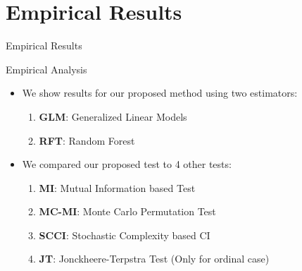 \documentclass{beamer}
\def\ci{\perp\!\!\!\!\!\perp}
\begin{document}
\section{Empirical Results}
\begin{frame}
	\begin{center} \Huge{Empirical Results} \end{center}
\end{frame}
\begin{frame}{Empirical Analysis}
	\begin{itemize}
		\setlength\itemsep{1em}
		\item We show results for our proposed method using two estimators:
			\begin{enumerate}
				\item \textbf{GLM}: Generalized Linear Models
				\item \textbf{RFT}: Random Forest
			\end{enumerate}
		\item We compared our proposed test to 4 other tests:
			\begin{enumerate}
				\item \textbf{MI}: Mutual Information based Test
				\item \textbf{MC-MI}: Monte Carlo Permutation Test
				\item \textbf{SCCI}: Stochastic Complexity based CI
				\item \textbf{JT}: Jonckheere-Terpstra Test (Only for ordinal case)
			\end{enumerate}
	\end{itemize}
\end{frame}
\end{document}

